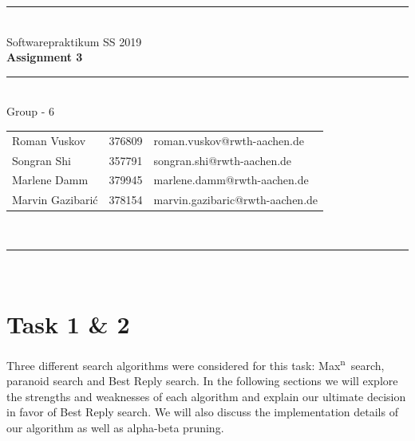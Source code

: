 \documentclass[a4paper,12pt]{article}
\newcommand{\Maxn}{Max\textsuperscript{n}\ }
\begin{document}
    
    \begin{center}
        \rule{\textwidth}{0.1pt}\\[1cm]
        
        \Large Softwarepraktikum SS 2019\\\bf Assignment 3
    \end{center}
    
    
    \begin{center}
        
        \rule{\textwidth}{0.1pt}\\[0.5cm]
        
        {\Large Group - 6\\[5mm]}
        
        \begin{tabular}{lll}
            
            Roman Vuskov & 376809 & roman.vuskov@rwth-aachen.de \\
            
            Songran Shi & 357791 & songran.shi@rwth-aachen.de \\
            
            Marlene Damm & 379945 & marlene.damm@rwth-aachen.de \\
            
            Marvin Gazibarić & 378154 & marvin.gazibaric@rwth-aachen.de \\
            
        \end{tabular}\\[0.5cm]
        
        \rule{\textwidth}{0.1pt}\\[1cm]
        
    \end{center}
    
    \newpage
    \section{Task 1 \& 2}
    Three different search algorithms were considered for this task: \Maxn search, paranoid search and Best Reply search. In the following sections we will explore the strengths and weaknesses of each algorithm and explain our ultimate decision in favor of Best Reply search. We will also discuss the implementation details of our algorithm as well as alpha-beta pruning.
    
\end{document}
